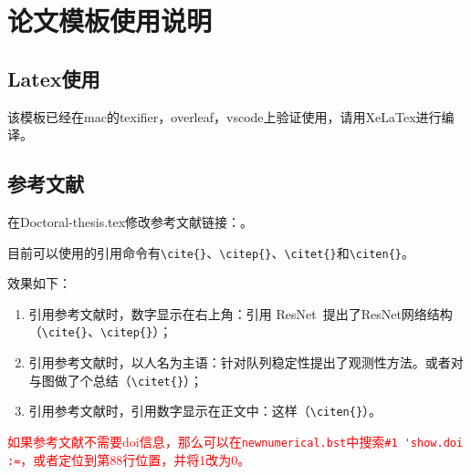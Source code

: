 \chapter{论文模板使用说明}
\section{Latex使用}
该模板已经在mac的texifier，overleaf，vscode上验证使用，请用XeLaTex进行编译。



\section{参考文献}

在Doctoral-thesis.tex修改参考文献链接：\lstinline!!。

目前可以使用的引用命令有\lstinline!\cite{}!、\lstinline!\citep{}!、\lstinline!\citet{}!和\lstinline!\citen{}!。

效果如下：
\begin{enumerate}
	\item 引用参考文献时，数字显示在右上角：引用 ResNet~\cite{2020_aradi_Survey}提出了ResNet网络结构\citep{2020_aradi_Survey}（\lstinline!\cite{}!、\lstinline!\citep{}!）；
	\item 引用参考文献时，以人名为主语：\citet{2017_qinxiaohui_FeiYunZhiCheLiangDuiLieDeFenBuShiKongZhi}针对队列稳定性提出了观测性方法。或者\citet{2021_chen_Graph}对与图做了个总结（\lstinline!\citet{}!）；
	\item 引用参考文献时，引用数字显示在正文中：这样（\lstinline!\citen{}!）。
\end{enumerate}

\textcolor{red}{如果参考文献不需要doi信息，那么可以在\lstinline!newnumerical.bst!中搜索\lstinline!#1 'show.doi :=!，或者定位到第88行位置，并将1改为0。}



